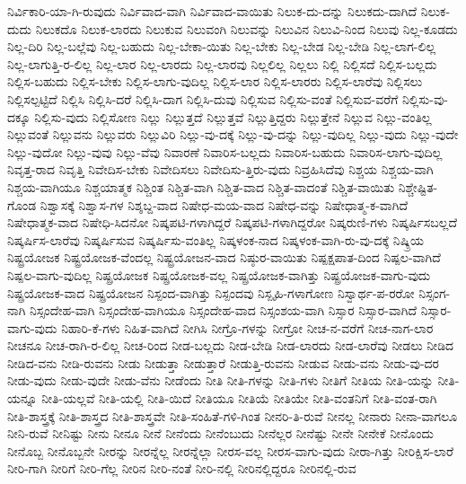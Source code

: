 {ನಿರ್ವಿಕಾರಿ-ಯಾ-ಗಿ-ರುವುದು
ನಿರ್ವಿವಾದ-ವಾಗಿ
ನಿರ್ವಿವಾದ-ವಾಯಿತು
ನಿಲುಕ-ದು-ದನ್ನು
ನಿಲುಕದು-ದಾಗಿದೆ
ನಿಲುಕ-ದುದು
ನಿಲುಕದೊ
ನಿಲುಕ-ಲಾರದು
ನಿಲುಕುವ
ನಿಲುವಂಗಿ
ನಿಲುವನ್ನು
ನಿಲುವಿನ
ನಿಲುವಿ-ನಿಂದ
ನಿಲುವು
ನಿಲ್ಲ-ಕೂಡದು
ನಿಲ್ಲ-ದಿರಿ
ನಿಲ್ಲ-ಬಲ್ಲೆವು
ನಿಲ್ಲ-ಬಹುದು
ನಿಲ್ಲ-ಬೇಕಾ-ಯಿತು
ನಿಲ್ಲ-ಬೇಕು
ನಿಲ್ಲ-ಬೇಡ
ನಿಲ್ಲ-ಬೇಡಿ
ನಿಲ್ಲ-ಲಾಗ-ಲಿಲ್ಲ
ನಿಲ್ಲ-ಲಾಗುತ್ತಿ-ರ-ಲಿಲ್ಲ
ನಿಲ್ಲ-ಲಾರ
ನಿಲ್ಲ-ಲಾರದು
ನಿಲ್ಲ-ಲಾರವು
ನಿಲ್ಲಲಿಲ್ಲ
ನಿಲ್ಲಲು
ನಿಲ್ಲಿ
ನಿಲ್ಲಿಸದೆ
ನಿಲ್ಲಿಸ-ಬಲ್ಲದು
ನಿಲ್ಲಿಸ-ಬಹುದು
ನಿಲ್ಲಿಸ-ಬೇಕು
ನಿಲ್ಲಿಸ-ಲಾಗು-ವುದಿಲ್ಲ
ನಿಲ್ಲಿಸ-ಲಾರ
ನಿಲ್ಲಿಸ-ಲಾರರು
ನಿಲ್ಲಿಸ-ಲಾರೆವು
ನಿಲ್ಲಿಸಲು
ನಿಲ್ಲಿಸಲ್ಪಟ್ಟಿದೆ
ನಿಲ್ಲಿಸಿ
ನಿಲ್ಲಿಸಿ-ದರೆ
ನಿಲ್ಲಿಸಿ-ದಾಗ
ನಿಲ್ಲಿಸಿ-ದುವು
ನಿಲ್ಲಿಸುವ
ನಿಲ್ಲಿಸು-ವಂತೆ
ನಿಲ್ಲಿಸುವ-ವರೆಗೆ
ನಿಲ್ಲಿಸು-ವು-ದಕ್ಕೂ
ನಿಲ್ಲಿಸು-ವುದು
ನಿಲ್ಲಿಸೋಣ
ನಿಲ್ಲು
ನಿಲ್ಲುತ್ತದೆ
ನಿಲ್ಲುತ್ತವೆ
ನಿಲ್ಲುತ್ತಿದ್ದರು
ನಿಲ್ಲುತ್ತೇನೆ
ನಿಲ್ಲುವ
ನಿಲ್ಲು-ವಂತಿಲ್ಲ
ನಿಲ್ಲುವಂತೆ
ನಿಲ್ಲುವನು
ನಿಲ್ಲುವರು
ನಿಲ್ಲುವಿರಿ
ನಿಲ್ಲು-ವು-ದಕ್ಕೆ
ನಿಲ್ಲು-ವು-ದನ್ನು
ನಿಲ್ಲು-ವುದಿಲ್ಲ
ನಿಲ್ಲು-ವುದು
ನಿಲ್ಲು-ವುದೇ
ನಿಲ್ಲು-ವುದೋ
ನಿಲ್ಲು-ವುವು
ನಿಲ್ಲು-ವೆವು
ನಿವಾರಣೆ
ನಿವಾರಿಸ-ಬಲ್ಲದು
ನಿವಾರಿಸ-ಬಹುದು
ನಿವಾರಿಸ-ಲಾಗು-ವುದಿಲ್ಲ
ನಿವೃತ್ತ-ರಾದ
ನಿವೃತ್ತಿ
ನಿವೇದಿಸ-ಬೇಕು
ನಿವೇದಿಸಲು
ನಿವೇದಿಸು-ತ್ತಿರು-ವುದು
ನಿವ್ರಹಿಸಿದೆವು
ನಿಶ್ಚಯ
ನಿಶ್ಚಯ-ವಾಗಿ
ನಿಶ್ಚಯ-ವಾಗಿಯೂ
ನಿಶ್ಚಯಾತ್ಮಕ
ನಿಶ್ಚಿಂತ
ನಿಶ್ಚಿತ-ವಾಗಿ
ನಿಶ್ಚಿತ-ವಾದ
ನಿಶ್ಚಿತ-ವಾದಂತೆ
ನಿಶ್ಚಿತ-ವಾಯಿತು
ನಿಶ್ಚೇಷ್ಟಿತ-ಗೊಂಡ
ನಿಶ್ವಾಸಕ್ಕೆ
ನಿಶ್ವಾಸ-ಗಳ
ನಿಶ್ಶಬ್ದ-ವಾದ
ನಿಷೇಧ-ಮಯ-ವಾದ
ನಿಷೇಧ-ವನ್ನು
ನಿಷೇಧಾತ್ಮ-ಕ-ವಾಗಿದೆ
ನಿಷೇಧಾತ್ಮಕ-ವಾದ
ನಿಷೇಧಿ-ಸಿದನೋ
ನಿಷ್ಕಪಟಿ-ಗಳಾಗಿದ್ದರೆ
ನಿಷ್ಕಪಟಿ-ಗಳಾಗಿದ್ದರೋ
ನಿಷ್ಕರುಣಿ-ಗಳು
ನಿಷ್ಕರ್ಷಿಸಬಲ್ಲದೆ
ನಿಷ್ಕರ್ಷಿಸ-ಲಾರೆವು
ನಿಷ್ಕರ್ಷಿಸುವ
ನಿಷ್ಕರ್ಷಿಸು-ವಂತಿಲ್ಲ
ನಿಷ್ಕಳಂಕ-ನಾದ
ನಿಷ್ಕಳಂಕ-ವಾಗಿ-ರು-ವು-ದಕ್ಕೆ
ನಿಷ್ಕ್ರಿಯ
ನಿಷ್ಟ್ರಯೋಜಕ
ನಿಷ್ಟ್ರಯೋಜಕ-ವೆಂದಲ್ಲ
ನಿಷ್ಟ್ರಯೋಜನ-ವಾದ
ನಿಷ್ಠುರ-ವಾಯಿತು
ನಿಷ್ಪಕ್ಷಪಾತ-ದಿಂದ
ನಿಷ್ಪಲ-ವಾಗಿದೆ
ನಿಷ್ಪಲ-ವಾಗು-ವುದಿಲ್ಲ
ನಿಷ್ಪ್ರಯೋಜಕ
ನಿಷ್ಪ್ರಯೋಜಕ-ವಲ್ಲ
ನಿಷ್ಪ್ರಯೋಜಕ-ವಾಗಿತ್ತು
ನಿಷ್ಪ್ರಯೋಜಕ-ವಾಗು-ವುದು
ನಿಷ್ಪ್ರಯೋಜಕ-ವಾದ
ನಿಷ್ಪ್ರಯೋಜನ
ನಿಸ್ಪಂದ-ವಾಗಿತ್ತು
ನಿಸ್ಪಂದವು
ನಿಸ್ಪೃಹಿ-ಗಳಾಗೋಣ
ನಿಸ್ವಾರ್ಥ-ಪ-ರರೋ
ನಿಸ್ಸಂಗ-ನಾಗಿ
ನಿಸ್ಸಂದೇಹ-ವಾಗಿ
ನಿಸ್ಸಂದೇಹ-ವಾಗಿಯೂ
ನಿಸ್ಸಂದೇಹ-ವಾದ
ನಿಸ್ಸಂಶಯ-ವಾಗಿ
ನಿಸ್ಸಾರ
ನಿಸ್ಸಾರ-ವಾಗಿದೆ
ನಿಸ್ಸಾರ-ವಾಗು-ವುದು
ನಿಹಾರಿ-ಕೆ-ಗಳು
ನಿಹಿತ-ವಾಗಿದೆ
ನೀಗಿಸಿ
ನೀಗ್ರೊ-ಗಳನ್ನು
ನೀಗ್ರೋ
ನೀಚ-ನ-ವರೆಗೆ
ನೀಚ-ನಾಗ-ಲಾರ
ನೀಚನೂ
ನೀಚ-ರಾಗಿ-ರ-ಲಿಲ್ಲ
ನೀಚ-ರಿಂದ
ನೀಡ-ಬಲ್ಲದು
ನೀಡ-ಬೇಡಿ
ನೀಡ-ಲಾರದು
ನೀಡ-ಲಾರೆವು
ನೀಡಲು
ನೀಡಿದ
ನೀಡಿದ-ವನು
ನೀಡಿ-ರುವನು
ನೀಡು
ನೀಡುತ್ತಾ
ನೀಡುತ್ತಾರೆ
ನೀಡುತ್ತಿ-ರುವನು
ನೀಡುವ
ನೀಡು-ವನು
ನೀಡು-ವು-ದರ
ನೀಡು-ವುದು
ನೀಡು-ವುದೇ
ನೀಡು-ವೆನು
ನೀಡೆಂದು
ನೀತಿ
ನೀತಿ-ಗಳನ್ನು
ನೀತಿ-ಗಳು
ನೀತಿಗೆ
ನೀತಿಯ
ನೀತಿ-ಯನ್ನು
ನೀತಿ-ಯನ್ನೂ
ನೀತಿ-ಯಲ್ಲವೆ
ನೀತಿ-ಯಲ್ಲಿ
ನೀತಿ-ಯಿದೆ
ನೀತಿಯೂ
ನೀತಿಯೆ
ನೀತಿಯೇ
ನೀತಿ-ವಂತನಿಗೆ
ನೀತಿ-ವಂತ-ರಾಗಿ
ನೀತಿ-ಶಾಸ್ತ್ರಕ್ಕೆ
ನೀತಿ-ಶಾಸ್ತ್ರದ
ನೀತಿ-ಶಾಸ್ತ್ರವೇ
ನೀತಿ-ಸಂಹಿತೆ-ಗಳಿ-ಗಿಂತ
ನೀನರಿ-ತಿ-ರುವೆ
ನೀನಲ್ಲ
ನೀನಾರು
ನೀನಾ-ವಾಗಲೂ
ನೀನಿ-ರುವೆ
ನೀನಿಷ್ಟು
ನೀನು
ನೀನೂ
ನೀನೆ
ನೀನೆಂದು
ನೀನೆಂಬುದು
ನೀನೆಲ್ಲರ
ನೀನೆಷ್ಟು
ನೀನೇ
ನೀನೇಕೆ
ನೀನೊಂದು
ನೀನೊಬ್ಬ
ನೀನೊಬ್ಬನೇ
ನೀರನ್ನು
ನೀರನ್ನೆಲ್ಲ
ನೀರನ್ನೆಲ್ಲಾ
ನೀರಸ-ವಲ್ಲ
ನೀರಸ-ವಾಗು-ವುದು
ನೀರಾ-ಗಿತ್ತು
ನೀರಿಕ್ಷಿಸ-ಲಾರೆ
ನೀರಿ-ಗಾಗಿ
ನೀರಿಗೆ
ನೀರಿ-ಗೆಲ್ಲ
ನೀರಿನ
ನೀರಿ-ನಂತೆ
ನೀರಿ-ನಲ್ಲಿ
ನೀರಿನಲ್ಲಿದ್ದರೂ
ನೀರಿನಲ್ಲಿ-ರುವ
}
